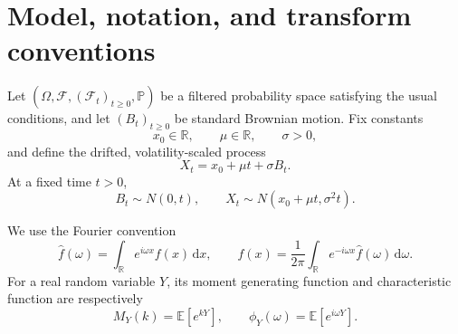 \documentclass[10pt,a4paper]{article}
\numberwithin{equation}{section}
\theoremstyle{blueplain}
\theoremstyle{definition}
\newcommand{\E}{\mathbb E}
\newcommand{\Pp}{\mathbb P}
\newcommand{\R}{\mathbb R}
\newcommand{\F}{\mathcal F}
\newcommand{\dd}{\,\mathrm d}
\begin{document}
\begin{abstract}
These notes develop the discrete-to-continuous architecture used in a Courant
treatment of stochastic processes.  Rademacher increments generate the
symmetric random walk, its elementary martingales, optional-stopping formulas,
and diffusion scaling.  Characteristic functions are separated from moment
generating functions, and L\'evy's continuity theorem is distinguished from
pointwise, uniform, in-measure, and path-space convergence.  Cantor
devil's-staircase constructions make atoms, tightness, and escaped mass
visible.  The analytic half derives the Brownian heat kernel by Fourier
inversion and an entire-function contour shift.  The measure-theoretic half
then constructs Wiener measure from consistent Gaussian finite-dimensional
laws, obtains continuous paths through Kolmogorov--Chentsov, builds the
stochastic integral by completion in \(L^2\), and proves It\^o isometry and
It\^o's formula.  A complete Donsker proof establishes tightness in
\(C([0,T])\) by dyadic modulus estimates and Arzel\`a--Ascoli before applying
Prokhorov.  Finally, Girsanov's theorem identifies the Radon--Nikodym density
for drift removal, while the generator, Dynkin formula, Feynman--Kac formula,
and distributional forward equation connect the probabilistic construction to
classical, mild, and weak PDE solutions.  Five Python figures retain a common
NYU-violet notation throughout.
\end{abstract}

\tableofcontents
\clearpage
{}

\section{Model, notation, and transform conventions}

Let \((\Omega,\F,(\F_t)_{t\ge0},\Pp)\) be a filtered probability space satisfying
the usual conditions, and let \((B_t)_{t\ge0}\) be standard Brownian motion.
Fix constants
\[
  x_0\in\R,\qquad \mu\in\R,\qquad \sigma>0,
\]
and define the drifted, volatility-scaled process
\begin{equation}
  X_t=x_0+\mu t+\sigma B_t.
  \label{eq:model}
\end{equation}
At a fixed time \(t>0\),
\[
  B_t\sim N(0,t),
  \qquad
  X_t\sim N(x_0+\mu t,\sigma^2t).
\]

We use the Fourier convention
\begin{equation}
  \widehat f(\omega)=\int_{\R}e^{i\omega x}f(x)\dd x,
  \qquad
  f(x)=\frac1{2\pi}\int_{\R}e^{-i\omega x}\widehat f(\omega)\dd\omega.
  \label{eq:fourier-convention}
\end{equation}
For a real random variable \(Y\), its moment generating function and
characteristic function are respectively
\[
  M_Y(k)=\E[e^{kY}],
  \qquad
  \phi_Y(\omega)=\E[e^{i\omega Y}].
\]
\end{document}
